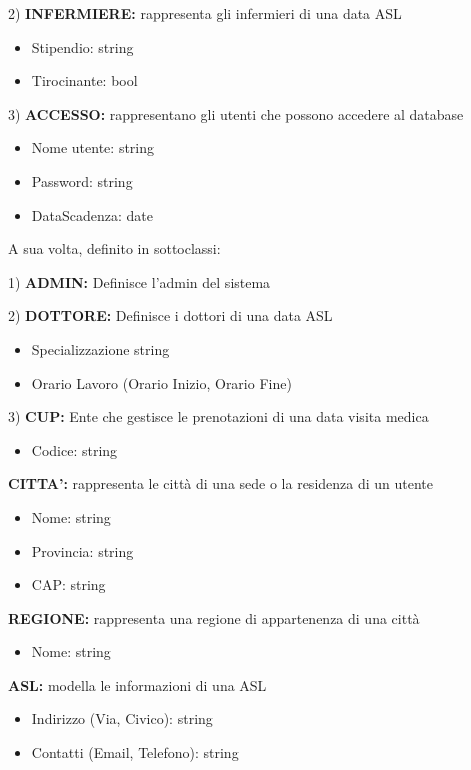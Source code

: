 \documentclass{report}
\begin{document}
2) \textbf{INFERMIERE:} 
rappresenta gli infermieri di una data ASL
\begin{itemize}
\item Stipendio: string
\item Tirocinante: bool
\end{itemize}

3) \textbf{ACCESSO:} 
rappresentano gli utenti che possono accedere al database
\begin{itemize}
\item Nome utente: string
\item Password: string
\item DataScadenza: date
\end{itemize}

A sua volta, definito in sottoclassi:

1) \textbf{ADMIN:}
Definisce l’admin del sistema

2) \textbf{DOTTORE:}
 Definisce i dottori di una data ASL
\begin{itemize}
\item Specializzazione string
\item Orario Lavoro (Orario Inizio, Orario Fine)
\end{itemize}

3) \textbf{CUP:} 
Ente che gestisce le prenotazioni di una data visita medica
\begin{itemize}
\item Codice: string
\end{itemize}

\textbf{CITTA’:} 
rappresenta le città di una sede o la residenza di un utente
\begin{itemize}
\item Nome: string
\item Provincia: string
\item CAP: string
\end{itemize}

\textbf{REGIONE:} 
rappresenta una regione di appartenenza di una città
\begin{itemize}
\item Nome: string
\end{itemize}

\textbf{ASL:} 
modella le informazioni di una ASL
\begin{itemize}
\item Indirizzo (Via, Civico): string
\item Contatti (Email, Telefono): string
\end{itemize}
\end{document}
